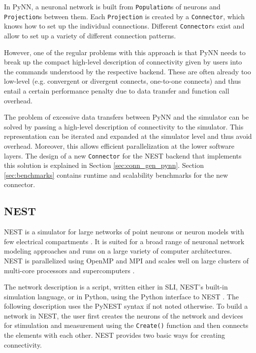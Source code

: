 \documentclass{frontiersSCNS} %
\begin{document}
In PyNN, a neuronal network is built from \verb|Population|s of
neurons and \verb|Projection|s between them. Each \verb|Projection| is
created by a \verb|Connector|, which knows how to set up the individual
connections. Different \verb|Connector|s exist and allow to set up a variety
of different connection patterns.

However, one of the regular problems with this approach is that PyNN
needs to break up the compact high-level description of connectivity
given by users into the commands understood by the respective
backend. These are often already too low-level (e.g. convergent or
divergent connects, one-to-one connects) and thus entail a certain
performance penalty due to data transfer and function call overhead.

The problem of excessive data transfers between PyNN and the simulator
can be solved by passing a high-level description of connectivity to
the simulator. This representation can be iterated and expanded at the
simulator level and thus avoid overhead. Moreover, this allows
efficient parallelization at the lower software layers.  The design of
a new \verb|Connector| for the NEST backend that implements this
solution is explained in Section \ref{sec:conn_gen_pynn}. Section
\ref{sec:benchmarks} contains runtime and scalability benchmarks for
the new connector.

\subsection{NEST}

NEST is a simulator for large networks of point neurons or neuron
models with few electrical compartments
\citep[\url{http://www.nest-initiative.org};][]{Gewaltig_07_11204}. It
is suited for a broad range of neuronal network modeling approaches
and runs on a large variety of computer architectures. NEST is
parallelized using OpenMP \citep{OpenMPSpec} and MPI
\citep{MPIForum94} and scales well on large clusters of multi-core
processors and supercomputers \citep{Helias12_26}.

The network description is a script, written either in SLI, NEST's
built-in simulation language, or in Python, using the Python interface
to NEST \citep[PyNEST;][]{Eppler09_12}. The following description uses
the PyNEST syntax if not noted otherwise. To build a network in NEST,
the user first creates the neurons of the network and devices for
stimulation and measurement using the \verb|Create()| function and
then connects the elements with each other. NEST provides two basic
ways for creating connectivity.
\end{document}

